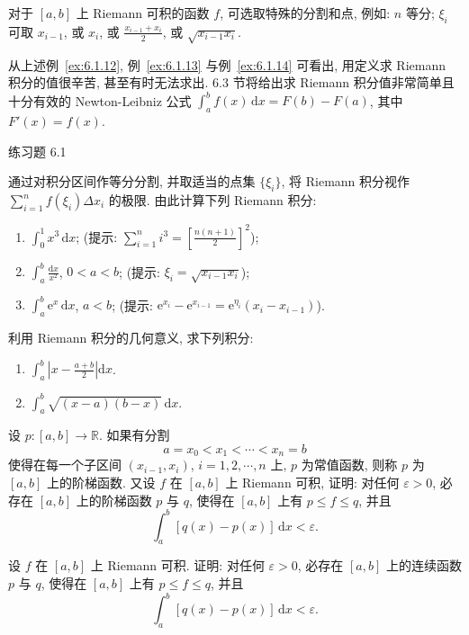 \begin{remark}\label{remark:6.1.2}
对于 $[a,b]$ 上 Riemann 可积的函数 $f$, 可选取特殊的分割和点, 例如: $n$ 等分; $\xi_{i}$ 可取 $x_{i-1}$, 或 $x_{i}$, 或 $\frac{x_{i-1}+x_{i}}{2}$, 或 $\sqrt{x_{i-1}x_{i}}$.
\end{remark}

从上述例~\ref{ex:6.1.12}, 例~\ref{ex:6.1.13} 与例~\ref{ex:6.1.14} 可看出, 用定义求 Riemann 积分的值很辛苦, 甚至有时无法求出. 6.3 节将给出求 Riemann 积分值非常简单且十分有效的 Newton-Leibniz 公式 $\int_{a}^{b}f(x)\,\mathrm{d}x=F(b)-F(a)$, 其中 $F'(x)=f(x)$.

\begin{exblock}{练习题 6.1}
  \item 通过对积分区间作等分分割, 并取适当的点集 $\{\xi_{i}\}$, 将 Riemann 积分视作 $\sum\limits_{i=1}^{n}f(\xi_{i})\Delta x_{i}$ 的极限. 由此计算下列 Riemann 积分:
  \begin{enumerate}[label=(\arabic*)]
    \item $\int_{0}^{1}x^{3}\,\mathrm{d}x$; (提示: $\sum\limits_{i=1}^{n}i^{3}=\left[\frac{n(n+1)}{2}\right]^{2}$);
    \item $\int_{a}^{b}\frac{\mathrm{d}x}{x^{2}}$, $0<a<b$; (提示: $\xi_{i}=\sqrt{x_{i-1}x_{i}}$);
    \item $\int_{a}^{b}\mathrm{e}^{x}\,\mathrm{d}x$, $a<b$; (提示: $\mathrm{e}^{x_{i}}-\mathrm{e}^{x_{i-1}}=\mathrm{e}^{\eta_{i}}(x_{i}-x_{i-1})$).
  \end{enumerate}

  \item 利用 Riemann 积分的几何意义, 求下列积分:
  \begin{enumerate}[label=(\arabic*)]
    \item $\int_{a}^{b}\left|x-\frac{a+b}{2}\right|\mathrm{d}x$.
    \item $\int_{a}^{b}\sqrt{(x-a)(b-x)}\,\mathrm{d}x$.
  \end{enumerate}

  \item 设 $p:[a,b]\to\mathbb{R}$. 如果有分割
  \[
  a=x_{0}<x_{1}<\cdots<x_{n}=b
\]
  使得在每一个子区间 $(x_{i-1},x_{i})$, $i=1,2,\cdots,n$ 上, $p$ 为常值函数, 则称 $p$ 为 $[a,b]$ 上的阶梯函数. 又设 $f$ 在 $[a,b]$ 上 Riemann 可积, 证明: 对任何 $\varepsilon>0$, 必存在 $[a,b]$ 上的阶梯函数 $p$ 与 $q$, 使得在 $[a,b]$ 上有 $p\leqslant f\leqslant q$, 并且
  \[
  \int_{a}^{b}[q(x)-p(x)]\,\mathrm{d}x<\varepsilon.
\]

  \item 设 $f$ 在 $[a,b]$ 上 Riemann 可积. 证明: 对任何 $\varepsilon>0$, 必存在 $[a,b]$ 上的连续函数 $p$ 与 $q$, 使得在 $[a,b]$ 上有 $p\leqslant f\leqslant q$, 并且
  \[
  \int_{a}^{b}[q(x)-p(x)]\,\mathrm{d}x<\varepsilon.
\]


\end{exblock}
